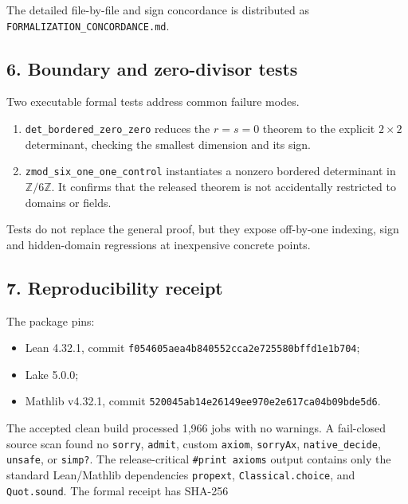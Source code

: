 \documentclass[
  11pt,
  a4paper,
]{article}
\providecommand{\tightlist}{%
  \setlength{\itemsep}{0pt}\setlength{\parskip}{0pt}}
\begin{document}
The detailed file-by-file and sign concordance is distributed as
\texttt{FORMALIZATION\_CONCORDANCE.md}.

\subsection{6. Boundary and zero-divisor
tests}\label{boundary-and-zero-divisor-tests}

Two executable formal tests address common failure modes.

\begin{enumerate}
\def\labelenumi{\arabic{enumi}.}
\tightlist
\item
  \texttt{det\_bordered\_zero\_zero} reduces the \(r=s=0\) theorem to
  the explicit \(2\times2\) determinant, checking the smallest dimension
  and its sign.
\item
  \texttt{zmod\_six\_one\_one\_control} instantiates a nonzero bordered
  determinant in \(\mathbb Z/6\mathbb Z\). It confirms that the released
  theorem is not accidentally restricted to domains or fields.
\end{enumerate}

Tests do not replace the general proof, but they expose off-by-one
indexing, sign and hidden-domain regressions at inexpensive concrete
points.

\subsection{7. Reproducibility receipt}\label{reproducibility-receipt}

The package pins:

\begin{itemize}
\tightlist
\item
  Lean 4.32.1, commit \texttt{f054605aea4b840552cca2e725580bffd1e1b704};
\item
  Lake 5.0.0;
\item
  Mathlib v4.32.1, commit
  \texttt{520045ab14e26149ee970e2e617ca04b09bde5d6}.
\end{itemize}

The accepted clean build processed 1,966 jobs with no warnings. A
fail-closed source scan found no \texttt{sorry}, \texttt{admit}, custom
\texttt{axiom}, \texttt{sorryAx}, \texttt{native\_decide},
\texttt{unsafe}, or \texttt{simp?}. The release-critical
\texttt{\#print\ axioms} output contains only the standard Lean/Mathlib
dependencies \texttt{propext}, \texttt{Classical.choice}, and
\texttt{Quot.sound}. The formal receipt has SHA-256
\end{document}
